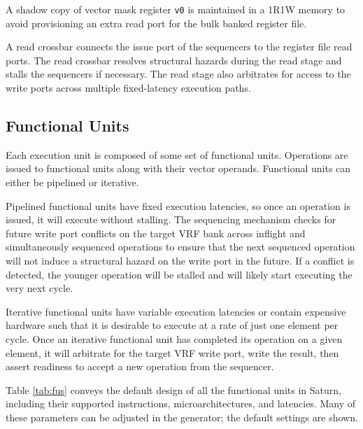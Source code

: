 A shadow copy of  vector mask register \texttt{v0} is maintained in a 1R1W memory to avoid provisioning an extra read port for the bulk banked register file.

A read crossbar connects the issue port of the sequencers to the register file read ports.
The read crossbar resolves structural hazards during the read stage and stalls the sequencers if necessary.
The read stage also arbitrates for access to the write ports across multiple fixed-latency execution paths.

\subsection{Functional Units}

Each execution unit is composed of some set of functional units.
Operations are issued to functional units along with their vector operands.
Functional units can either be pipelined or iterative.

Pipelined functional units have fixed execution latencies, so once an operation is issued, it will execute without stalling.
The sequencing mechanism checks for future write port conflicts on the target VRF bank across inflight and simultaneously sequenced operations to ensure that the next sequenced operation will not induce a structural hazard on the write port in the future.
If a conflict is detected, the younger operation will be stalled and will likely start executing the very next cycle.

Iterative functional units have variable execution latencies or contain expensive hardware such that it is desirable to execute at a rate of just one element per cycle.
Once an iterative functional unit has completed its operation on a given element, it will arbitrate for the target VRF write port, write the result, then assert readiness to accept a new operation from the sequencer.

Table \ref{tab:fus} conveys the default design of all the functional units in Saturn, including their supported instructions, microarchitectures, and latencies.
Many of these parameters can be adjusted in the generator; the default settings are shown.

